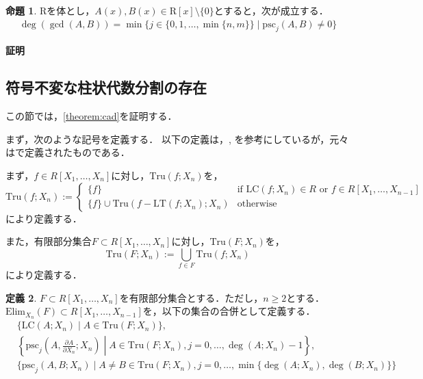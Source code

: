 \documentclass[uplatex, dvipdfmx]{jsarticle}
\makeatletter
\numberwithin{equation}{section}
\renewenvironment{proof}[1][\proofname]{\par
  \pushQED{\qed}%
  \normalfont \topsep6\p@\@plus6\p@\relax
  \trivlist
  \item\relax
  {\bfseries
  #1\@addpunct{.}}\hspace\labelsep\ignorespaces
}{
  \popQED\endtrivlist\@endpefalse
}
\newcommand{\psc}{\mathrm{psc}}
\newcommand{\PSC}{\mathrm{PSC}}
\newcommand{\Elim}{\mathrm{Elim}}
\newcommand{\Tru}{\mathrm{Tru}}
\newcommand{\LT}{\mathrm{LT}}
\newcommand{\LC}{\mathrm{LC}}
\theoremstyle{definition}
\newtheorem{definition}{定義}[section]
\newtheorem{proposition}[definition]{命題}
\renewcommand{\proofname}{\textbf{証明}}
\makeatother
\begin{document}
\begin{proposition}\label{proposition:psc}
$\mathrm{R}$を体とし，$A(x), B(x) \in \mathrm{R}[x] \setminus \{0\}$とすると，次が成立する．
\begin{align}
\deg(\gcd(A, B)) = \min \{ j  \in \{0,1, \dots, \min\{n,m\}\}\mid \psc_j(A,B) \neq 0\}
\end{align}
\end{proposition}

\begin{proof}
\end{proof}

\subsection{符号不変な柱状代数分割の存在}
この節では，\cref{theorem:cad}を証明する．

まず，次のような記号を定義する．
以下の定義は，\cite[Section 3]{MR0764184}, \cite[Notation 5.15.]{MR2248869}
を参考にしているが，元々は\cite[Theorem 4]{MR0403962}で定義されたものである．

まず，$f \in R[X_1, \dots, X_n]$に対し，$\Tru(f;X_n)$を，
\begin{equation}
     \Tru(f;X_n):= \begin{cases}
          \{f\} &  \text{if $\LC(f; X_n) \in R$ or $f \in R[X_1, \dots, X_{n-1}]$} \\
          \{f\} \cup \Tru(f-\LT(f;X_n);X_n) & \text{otherwise}
     \end{cases}
\end{equation}
により定義する．

また，有限部分集合$F \subset R[X_1, \dots, X_n]$に対し，$\Tru(F;X_n)$を，
\begin{equation}
     \Tru(F;X_n) := \bigcup_{f \in F} \Tru(f;X_n)
\end{equation}
により定義する．

\begin{definition}
$F \subset R[X_1, \dots, X_n]$を有限部分集合とする．ただし，$n \geq 2$とする．
$\Elim_{X_n}(F) \subset R[X_1, \dots, X_{n-1}]$を，以下の集合の合併として定義する．
\begin{align} 
     &\{\LC(A;X_n) \mid A \in \Tru(F;X_n) \},\\
     &\left\{ \psc_j\left(A,\frac{\partial A}{\partial X_n};X_n\right) \middle| A \in \Tru(F;X_n), j= 0, \dots, \deg(A;X_n)-1\right\},\\
     &\{\psc_j(A,B;X_n) \mid A \neq B \in \Tru(F; X_n), j = 0, \dots, \min\{\deg(A;X_n), \deg(B;X_n)\}\}
\end{align}
\end{definition}
\end{document}
